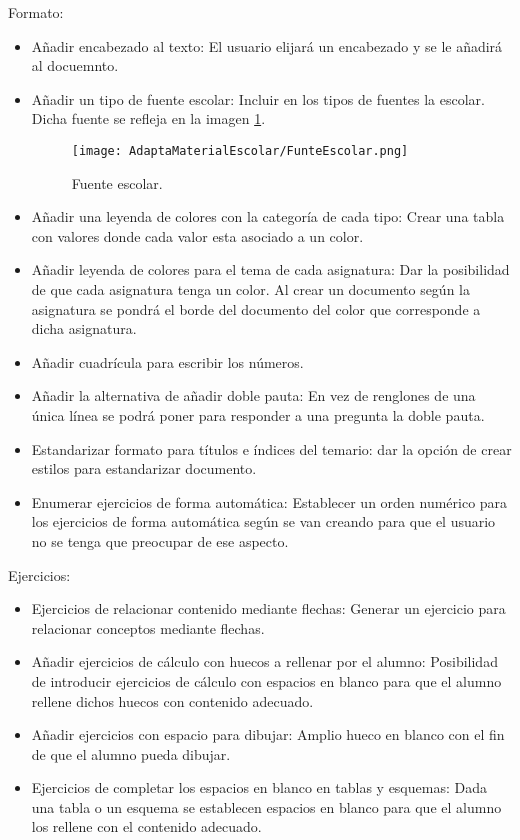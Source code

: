 Formato: 
\begin{itemize}
  \item Añadir encabezado al texto: El usuario elijará un encabezado y se le añadirá al docuemnto.
  \item Añadir un tipo de fuente escolar: Incluir en los tipos de fuentes la escolar. Dicha fuente se refleja en la imagen \ref{escolar}.
  \begin{figure}[ht!]
    \centering
    \texttt{[image: AdaptaMaterialEscolar/FunteEscolar.png]}
    \caption{Fuente escolar.}
    \label{escolar}
\end{figure}
  \item Añadir una leyenda de colores con la categoría de cada tipo: Crear una tabla con valores donde cada valor esta asociado a un color.
  \item Añadir leyenda de colores para el tema de cada asignatura: Dar la posibilidad de que cada asignatura tenga un color. Al crear un documento según la asignatura se pondrá el borde del documento del color que corresponde a dicha asignatura.
  \item Añadir cuadrícula para escribir los números.
  \item Añadir la alternativa de añadir doble pauta: En vez de renglones de una única línea se podrá poner para responder a una pregunta la doble pauta.
  \item Estandarizar formato para títulos e índices del temario: dar la opción de crear estilos para estandarizar documento.
  \item Enumerar ejercicios de forma automática: Establecer un orden numérico para los ejercicios de forma automática según se van creando para que el usuario no se tenga que preocupar de ese aspecto.
\end{itemize}
Ejercicios:
\begin{itemize}
  \item Ejercicios de relacionar contenido mediante flechas: Generar un ejercicio para relacionar conceptos mediante flechas.
  \item Añadir ejercicios de cálculo con huecos a rellenar por el alumno: Posibilidad de introducir ejercicios de cálculo con espacios en blanco para que el alumno rellene dichos huecos con contenido adecuado.
  \item Añadir ejercicios con espacio para dibujar: Amplio hueco en blanco con el fin de que el alumno pueda dibujar.
  \item Ejercicios de completar los espacios en blanco en tablas y esquemas: Dada una tabla o un esquema se establecen espacios en blanco para que el alumno los rellene con el contenido adecuado.
\end{itemize}
